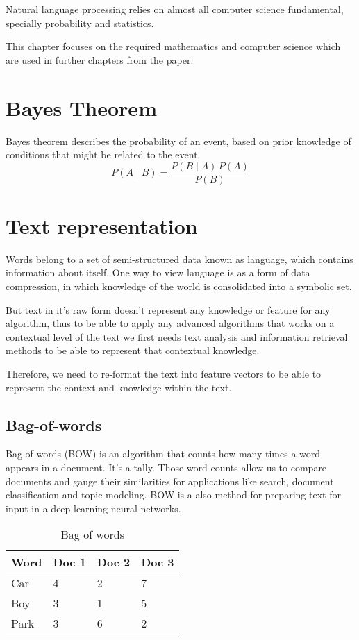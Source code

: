 Natural language processing relies on almost all computer science fundamental, specially probability and statistics.

This chapter focuses on the required mathematics and computer science which are used in further chapters from the paper.

\section{Bayes Theorem}
Bayes theorem describes the probability of an event, based on prior knowledge of conditions that might be related to the event.
$$ P(A \mid B) = \frac{P(B \mid A) \, P(A)}{P(B)} $$
\section{Text representation}

Words belong to a set of semi-structured data known as language, which contains information about itself.
One way to view language is as a form of data compression, in which knowledge of the world is consolidated into a symbolic set.

But text in it's raw form doesn't represent any knowledge or feature for any algorithm, thus to be able to apply any advanced algorithms that works on a contextual level of the text we first needs text analysis and information retrieval methods to be able to represent that contextual knowledge.

Therefore, we need to re-format the text into feature vectors to be able to represent the context and knowledge within the text.

\vspace{.5cm}

\subsection{Bag-of-words}

Bag of words (BOW) is an algorithm that counts how many times a word appears in a document. It’s a tally. Those word counts allow us to compare documents and gauge their similarities for applications like search, document classification and topic modeling. BOW is a also method for preparing text for input in a deep-learning neural networks.

\begin{table}[ht]
\centering
\caption{Bag of words}
\begin{tabular}{|l|l|l|l|} 
\hline
Word & Doc 1 & Doc 2 & Doc 3  \\ 
\hline
Car  & 4     & 2     & 7      \\ 
\hline
Boy  & 3     & 1     & 5      \\ 
\hline
Park & 3     & 6     & 2      \\
\hline
\end{tabular}
\end{table}

